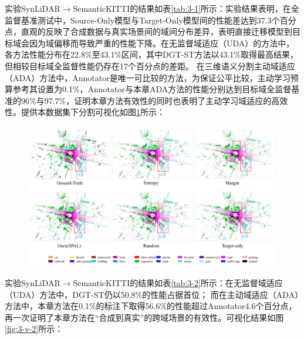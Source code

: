 实验SynLiDAR\(\to\)SemanticKITTI的结果如表\ref{tab:3-1}所示：实验结果表明，在全监督基准测试中，Source-Only模型与Target-Only模型间的性能差达到37.3个百分点，直观的反映了合成数据与真实场景间的域间分布差异，表明直接迁移模型到目标域会因为域偏移而导致严重的性能下降。在无监督域适应（UDA）的方法中，各方法性能分布在22.8\%至43.1\%区间，其中DGT-ST方法以43.1\%取得最高结果，但相较目标域全监督性能仍存在17个百分点的差距。
在三维语义分割主动域适应（ADA）方法中，Annotator是唯一可比较的方法，为保证公平比较，主动学习预算参考其设置为0.1\%，Annotator与本章ADA方法的性能分别达到目标域全监督基准的96\%与97.7\%，证明本章方法有效性的同时也表明了主动学习域适应的高效性。提供本数据集下分割可视化如图\ref{fig:3-v-1}所示：
\vspace{-0.1cm}
\begin{figure}[H]
    \centering
    \includegraphics[width = \textwidth]{ljx/figure/3_vision_s2k1.pdf}
    \label{fig:3-v-1}
\end{figure}
\vspace{-0.35cm}
\vspace{0.1cm}

实验SynLiDAR\(\to\)SemanticKITTI的结果如表\ref{tab:3-2}所示：在无监督域适应（UDA）方法中，DGT-ST仍以50.8\%的性能占据首位；
而在主动域适应（ADA）方法中，本章方法在0.1\%的标注下取得56.6\%的性能超过Annotator4.6个百分点，再一次证明了本章方法在“合成到真实”的跨域场景的有效性。可视化结果如图\ref{fig:3-v-2}所示：

